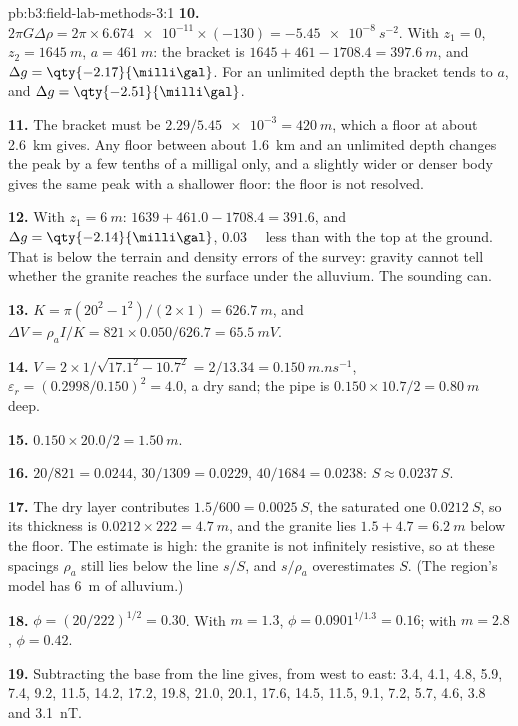 \begin{solution}{pb:b3:field-lab-methods-3:1}
\textbf{10.} $2\pi G\Delta\rho = 2\pi\times\num{6.674e-11}\times(-130) =
\qty{-5.45e-8}{s^{-2}}$. With $z_1 = 0$, $z_2 = \qty{1645}{m}$, $a =
\qty{461}{m}$: the bracket is $1645 + 461 - 1708.4 = \qty{397.6}{m}$,
and $\Delta g = \qty{-2.17}{\milli\gal}$. For an unlimited depth the
bracket tends to $a$, and $\Delta g = \qty{-2.51}{\milli\gal}$.

\textbf{11.} The bracket must be $2.29/\num{5.45e-3} = \qty{420}{m}$, which a
floor at about \qty{2.6}{km} gives. Any floor between about
\qty{1.6}{km} and an unlimited depth changes the peak by a few tenths
of a milligal only, and a slightly wider or denser body gives the same
peak with a shallower floor: the floor is not resolved.

\textbf{12.} With $z_1 = \qty{6}{m}$: $1639 + 461.0 - 1708.4 = 391.6$, and
$\Delta g = \qty{-2.14}{\milli\gal}$, \qty{0.03}{\milli\gal} less than
with the top at the ground. That is below the terrain and density
errors of the survey: gravity cannot tell whether the granite reaches
the surface under the alluvium. The sounding can.

\textbf{13.} $K = \pi(20^2 - 1^2)/(2\times1) = \qty{626.7}{m}$, and $\Delta V =
\rho_a I/K = 821\times0.050/626.7 = \qty{65.5}{mV}$.

\textbf{14.} $V = 2\times1/\sqrt{17.1^2 - 10.7^2} = 2/13.34 =
\qty{0.150}{m.ns^{-1}}$, $\varepsilon_r = (0.2998/0.150)^2 = 4.0$, a
dry sand; the pipe is $0.150\times10.7/2 = \qty{0.80}{m}$ deep.

\textbf{15.} $0.150\times20.0/2 = \qty{1.50}{m}$.

\textbf{16.} $20/821 = \num{0.0244}$, $30/1309 = \num{0.0229}$, $40/1684 =
\num{0.0238}$: $S \approx \qty{0.0237}{S}$.

\textbf{17.} The dry layer contributes $1.5/600 = \qty{0.0025}{S}$, the
saturated one $\qty{0.0212}{S}$, so its thickness is $0.0212\times222 =
\qty{4.7}{m}$, and the granite lies $1.5 + 4.7 = \qty{6.2}{m}$ below
the floor. The estimate is high: the granite is not infinitely
resistive, so at these spacings $\rho_a$ still lies below the line
$s/S$, and $s/\rho_a$ overestimates $S$. (The region's model has
\qty{6}{m} of alluvium.)

\textbf{18.} $\phi = (20/222)^{1/2} = \num{0.30}$. With $m = 1.3$, $\phi =
0.0901^{1/1.3} = \num{0.16}$; with $m = 2.8$, $\phi = \num{0.42}$.

\textbf{19.} Subtracting the base from the line gives, from west to east:
3.4, 4.1, 4.8, 5.9, 7.4, 9.2, 11.5, 14.2, 17.2, 19.8, 21.0, 20.1, 17.6,
14.5, 11.5, 9.1, 7.2, 5.7, 4.6, 3.8 and \qty{3.1}{nT}.


\end{solution}
